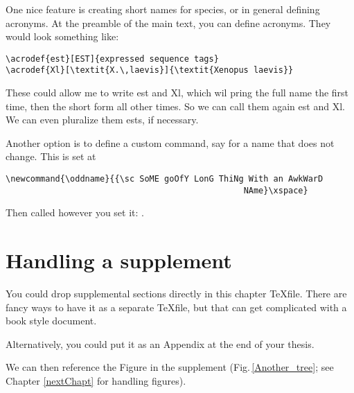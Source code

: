 \clearpage %

One nice feature is creating short names for species, or in general defining acronyms. At the preamble of the main text, you can define acronyms. They would look something like:
\begin{verbatim}
\acrodef{est}[EST]{expressed sequence tags}
\acrodef{Xl}[\textit{X.\,laevis}]{\textit{Xenopus laevis}}
\end{verbatim}

These could allow me to write \ac{est} and \ac{Xl}, which wil pring the full name the first time, then the short form all other times. So we can call them again \ac{est} and \ac{Xl}. We can even pluralize them \acp{est}, if necessary. 

Another option is to define a custom command, say for a name that does not change. This is set at 
\begin{verbatim}
\newcommand{\oddname}{{\sc SoME goOfY LonG ThiNg With an AwkWarD 
                                                NAme}\xspace}
\end{verbatim}

Then called however you set it: \oddname.

\section{Handling a supplement}

You could drop supplemental sections directly in this chapter \TeX file. There are fancy ways to have it as a separate \TeX file, but that can get complicated with a book style document. 

Alternatively, you could put it as an Appendix at the end of your thesis. 

We can then reference the Figure in the supplement (Fig.\,\ref{Another_tree}; see Chapter \ref{nextChapt} for handling figures). 










